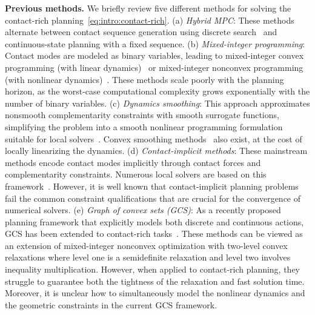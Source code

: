 \textbf{Previous methods.}
We briefly review five different methods for solving the contact-rich planning~\eqref{eq:intro:contact-rich}.
(a) \textit{Hybrid MPC}: These methods alternate between contact sequence generation using discrete search~\cite{chen2021iros-traopt-tree-search-multi-contact,wu2020icra-r3t-nonlinear-hybrid,cheng2022icra-contact-mode-quasidynamic,mastalli2020icra-crocoddyl} and continuous-state planning with a fixed sequence.
(b) \textit{Mixed-integer programming}: Contact modes are modeled as binary variables, leading to mixed-integer convex programming (with linear dynamics)~\cite{ding2020iros-motionplanning-multilegged-mixedinteger,marcucci2020arxiv-warmstart-mixedinteger-mpc} or mixed-integer nonconvex programming (with nonlinear dynamics)~\cite{koolen2020arxiv-balance-control-humanoid-nonlinear-centroidal}. These methods scale poorly with the planning horizon, as the worst-case computational complexity grows exponentially with the number of binary variables.
(c) \textit{Dynamics smoothing}: This approach approximates nonsmooth complementarity constraints with smooth surrogate functions, simplifying the problem into a smooth nonlinear programming formulation suitable for local solvers~\cite{chatzinikolaidis2021ral-traopt-contact-rich-implicit-ddp,tassa2014icra-control-limitted-ddp,mordatch2012tog-discovery-complex-behaviors-contact-invariant,tassa2012iros-synthesis-stabilization-online-traopt}. Convex smoothing methods~\cite{pang2023tro-global-planning-contact-rich-quasi-dynamic-contact-models} also exist, at the cost of locally linearizing the dynamics. 
(d) \textit{Contact-implicit methods}: These mainstream methods encode contact modes implicitly through contact forces and complementarity constraints. Numerous local solvers are based on this framework~\cite{aydinoglu2023icra-realtime-multicontact-mpc-admm,yunt2007isdc-combined-continuation-penalty,posa2014ijrr-traopt-directmethod-contact,manchester2020isrr-variational-contact-implicit,yang2024rss-dynamic-on-plam-control-sliding,le2024tro-fast-contact-implicit-mpc}. 
However, it is well known that contact-implicit planning problems fail the common constraint qualifications that are crucial for the convergence of numerical solvers.
(e) \textit{Graph of convex sets (GCS)}: As a recently proposed planning framework that explicitly models both discrete and continuous actions, GCS has been extended to contact-rich tasks~\cite{graesdal2024arxiv-tightconvexrelax-contactrich,yang2024arxiv-sdp-linear-piecewise-affine-optimal-control}. These methods can be viewed as an extension of mixed-integer nonconvex optimization with two-level convex relaxations where level one is a semidefinite relaxation and level two involves inequality multiplication. However, when applied to contact-rich planning, they struggle to guarantee both the tightness of the relaxation and fast solution time. Moreover, it is unclear how to simultaneously model the nonlinear dynamics and the geometric constraints in the current GCS framework.

